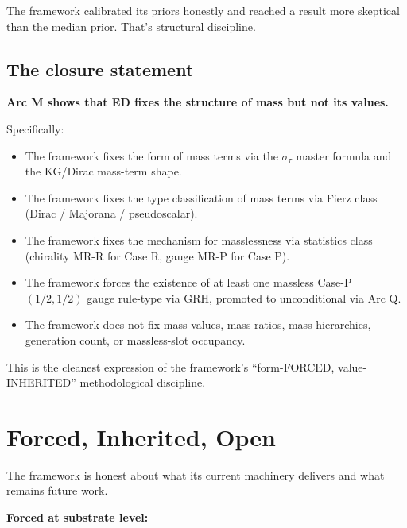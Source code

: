 \documentclass[11pt,a4paper]{article}
\begin{document}
The framework calibrated its priors honestly and reached a result more skeptical than the median prior. That's structural discipline.

\subsection{The closure statement}

\textbf{Arc M shows that ED fixes the structure of mass but not its values.}

Specifically:

\begin{itemize}[noitemsep]
  \item The framework fixes the form of mass terms via the $\sigma_\tau$ master formula and the KG/Dirac mass-term shape.
  \item The framework fixes the type classification of mass terms via Fierz class (Dirac / Majorana / pseudoscalar).
  \item The framework fixes the mechanism for masslessness via statistics class (chirality MR-R for Case R, gauge MR-P for Case P).
  \item The framework forces the existence of at least one massless Case-P $(1/2, 1/2)$ gauge rule-type via GRH, promoted to unconditional via Arc Q.
  \item The framework does not fix mass values, mass ratios, mass hierarchies, generation count, or massless-slot occupancy.
\end{itemize}

This is the cleanest expression of the framework's ``form-FORCED, value-INHERITED'' methodological discipline.

\section{Forced, Inherited, Open}

The framework is honest about what its current machinery delivers and what remains future work.

\textbf{Forced at substrate level:}
\end{document}
